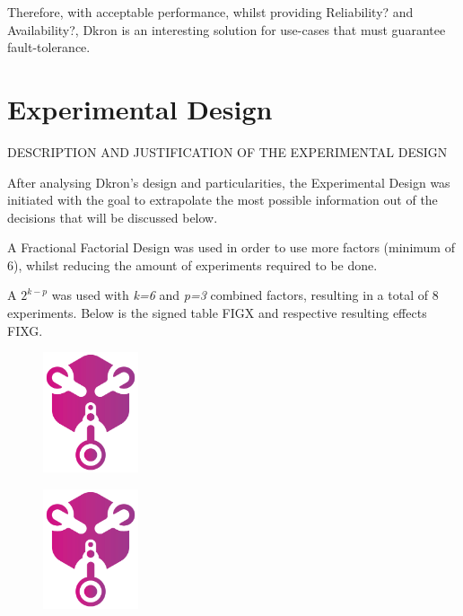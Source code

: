 \documentclass[runningheads]{llncs}
\begin{document}
Therefore, with acceptable performance, whilst providing Reliability? and Availability?, Dkron is an interesting solution
for use-cases that must guarantee fault-tolerance.

\section{Experimental Design}
DESCRIPTION AND JUSTIFICATION OF THE EXPERIMENTAL DESIGN

After analysing Dkron's design and particularities, the Experimental Design was initiated with the
goal to extrapolate the most possible information out of the decisions that will be discussed below.

A Fractional Factorial Design was used in order to use more factors (minimum of 6), whilst reducing
the amount of experiments required to be done.

A $2^{k-p}$ was used with \textit{k=6} and \textit{p=3} combined factors, resulting
in a total of 8 experiments. Below is the signed table FIGX and respective resulting effects FIXG.

\begin{figure}
\centering
\includegraphics[width=0.25\textwidth]{media/dkron-logo.png}
\end{figure}

\begin{figure}
\centering
\includegraphics[width=0.25\textwidth]{media/dkron-logo.png}
\end{figure}
\end{document}
